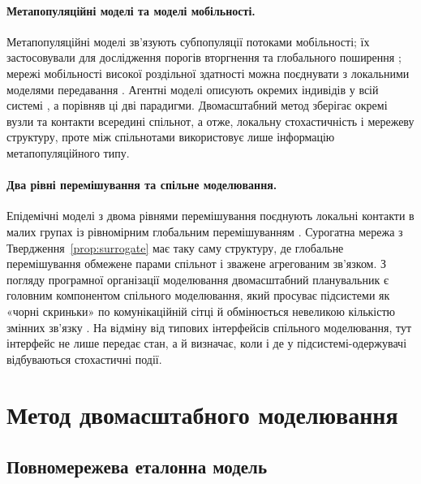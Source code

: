 \paragraph{Метапопуляційні моделі та моделі мобільності.}
Метапопуляційні моделі зв'язують субпопуляції потоками мобільності; їх застосовували для дослідження порогів вторгнення та глобального поширення \citep{colizza2007reaction,colizza2008,balcan2009,balcan2010modeling}; мережі мобільності високої роздільної здатності можна поєднувати з локальними моделями передавання \citep{chang2021}. Агентні моделі описують окремих індивідів у всій системі \citep{eubank2004,kerr2021}, а \citet{ajelli2010} порівняв ці дві парадигми. Двомасштабний метод зберігає окремі вузли та контакти всередині спільнот, а отже, локальну стохастичність і мережеву структуру, проте між спільнотами використовує лише інформацію метапопуляційного типу.

\paragraph{Два рівні перемішування та спільне моделювання.}
Епідемічні моделі з двома рівнями перемішування поєднують локальні контакти в малих групах із рівномірним глобальним перемішуванням \citep{ball1997}. Сурогатна мережа з Твердження~\ref{prop:surrogate} має таку саму структуру, де глобальне перемішування обмежене парами спільнот і зважене агрегованим зв'язком. З погляду програмної організації моделювання двомасштабний планувальник є головним компонентом спільного моделювання, який просуває підсистеми як «чорні скриньки» по комунікаційній сітці й обмінюється невеликою кількістю змінних зв'язку \citep{gomes2018cosim}. На відміну від типових інтерфейсів спільного моделювання, тут інтерфейс не лише передає стан, а й визначає, коли і де у підсистемі-одержувачі відбуваються стохастичні події.

\section{Метод двомасштабного моделювання}
\label{sec:method}

\subsection{Повномережева еталонна модель}
\label{sec:reference}

